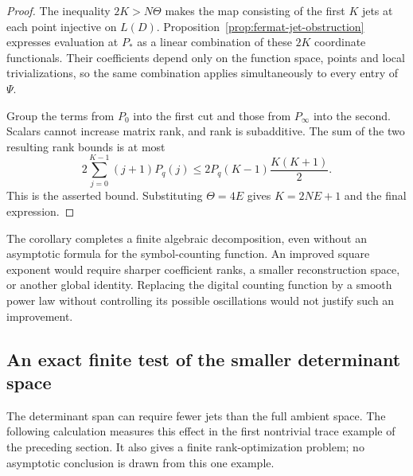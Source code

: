 \begin{proof}
The inequality $2K>N\Theta$ makes the map consisting of the
first $K$ jets at each point injective on $L(D)$.
Proposition~\ref{prop:fermat-jet-obstruction} expresses evaluation
at $P_*$ as a linear combination of these $2K$ coordinate
functionals. Their coefficients depend only on the function
space, points and local trivializations, so the same combination
applies simultaneously to every entry of $\Psi$.

Group the terms from $P_0$ into the first cut and those from
$P_\infty$ into the second. Scalars cannot increase matrix
rank, and rank is subadditive. The sum of the two resulting
rank bounds is at most
\[
 2\sum_{j=0}^{K-1}(j+1)P_q(j)
 \leq 2P_q(K-1)\frac{K(K+1)}2.
\]
This is the asserted bound. Substituting $\Theta=4E$ gives
$K=2NE+1$ and the final expression.
\end{proof}

The corollary completes a finite algebraic decomposition, even
without an asymptotic formula for the symbol-counting function.
An improved square exponent would require sharper coefficient
ranks, a smaller reconstruction space, or another global
identity. Replacing the digital counting function by a smooth
power law without controlling its possible oscillations would
not justify such an improvement.

\subsection{An exact finite test of the smaller determinant space}

The determinant span can require fewer jets than the full ambient
space. The following calculation measures this effect in the first
nontrivial trace example of the preceding section. It also gives a
finite rank-optimization problem; no asymptotic conclusion is drawn
from this one example.

